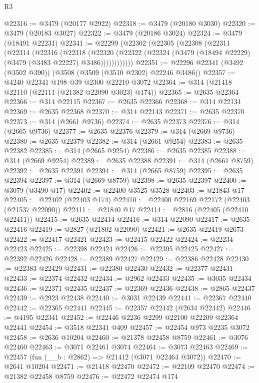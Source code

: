 \begin{lexlean}{R3}
\begin{coremodule}
@22316 := @3479 (@20177 @2922)
@22318 := @3479 (@20180 @3030)
@22320 := @3479 (@20183 @3027)
@22322 := @3479 (@20186 @3024)
@22324 := @3479 (@18491 @22231)
@22341 := @22299
    (@22302
      (@22305
        (@22308
          (@22311
            (@22314
              (@22316
                (@22318
                  (@22320
                    (@22322 (@22324 (@3479 (@18494 @22229) (@3479 (@3483 @22227) @3486))))))))))))
@22351 := @22296 @22341 (@3492 (@3502 @390)) (@3508 (@3509 (@3510 @2302) @22246 @3486))
@22357 := @4240 @22341 @198 @39 @2300 @22210 @3072
@22364 := @314 (@21418 @22110 (@22111 (@21382 @22090 @3023) @174))
@22365 := @2635 @22364
@22366 := @314 @22115
@22367 := @2635 @22366
@22368 := @314 @22134
@22369 := @2635 @22368
@22370 := @314 @22143
@22371 := @2635 @22370
@22373 := @314 (@2661 @9736)
@22374 := @2635 @22373
@22376 := @314 (@2665 @9736)
@22377 := @2635 @22376
@22379 := @314 (@2669 @9736)
@22380 := @2635 @22379
@22382 := @314 (@2661 @9254)
@22383 := @2635 @22382
@22385 := @314 (@2665 @9254)
@22386 := @2635 @22385
@22388 := @314 (@2669 @9254)
@22389 := @2635 @22388
@22391 := @314 (@2661 @8759)
@22392 := @2635 @22391
@22394 := @314 (@2665 @8759)
@22395 := @2635 @22394
@22397 := @314 (@2669 @8759)
@22398 := @2635 @22397
@22400 := @3079 (@3490 @17)
@22402 := @22400 @3525 @3528
@22403 := @21843 @17
@22405 := @22402 (@22403 @174)
@22410 := @22400 @22169 @22172 (@22403 (@21537 @22090))
@22411 := @21840 @17
@22414 := @2816 (@22405 (@22410 @22411))
@22415 := @2635 @22414
@22416 := @314 @22090
@22417 := @2635 @22416
@22419 := @2827 (@21802 @22090)
@22421 := @2635 @22419 @2673
@22422 := @22417 @22421
@22423 := @22415 @22422
@22424 := @22234 @22423
@22425 := @22398 @22424
@22426 := @22395 @22425
@22427 := @22392 @22426
@22428 := @22389 @22427
@22429 := @22386 @22428
@22430 := @22383 @22429
@22431 := @22380 @22430
@22432 := @22377 @22431
@22433 := @22374 @22432
@22434 := @2962 @22433
@22435 := @3035 @22434
@22436 := @22371 @22435
@22437 := @22369 @22436
@22438 := @2865 @22437
@22439 := @2923 @22438
@22440 := @3031 @22439
@22441 := @22367 @22440
@22442 := @22365 @22441
@22445 := @22357 @22442 (@2634 @22442)
@22446 := @4195 @22341
@22452 := @22446 @2236 @2299 @22100 @22209 @22364 @22441
@22454 := @3518 @22341 @409
@22457 := @22454 @973 @2235 @3072
@22458 := @2636 @10204
@22460 := @21378 @22458 @8759
@22461 := @3076 @22460
@22463 := @3071 @22461 @3074
@22464 := @3073 @22463
@22469 := @22457 (fun (__b : @2862) => @21412 (@3071 @22464 @3072))
@22470 := @2641 @10204
@22471 := @21418 @22470
@22472 := @22109 @22470
@22474 := @21382 @22458 @8759
@22476 := @22472 @22474 @174

\end{coremodule}
\end{lexlean}
